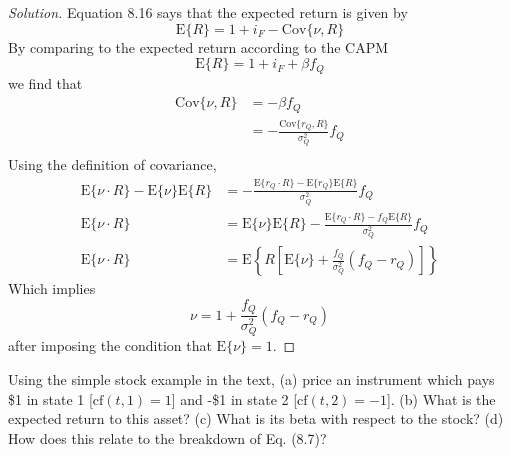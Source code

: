 \begin{proof}[Solution]
  Equation 8.16 says that the expected return is given by
  \begin{equation*}
   \mathrm{E}\{R\}=1+i_{F}-\mathrm{Cov}\{\nu,R\}
  \end{equation*}
  By comparing to the expected return according to the CAPM
  \begin{equation*}
   \mathrm{E}\{R\}=1+i_{F}+\beta f_{Q}
  \end{equation*}
  we find that
  \begin{align*}
   \mathrm{Cov}\{\nu,R\}&=-\beta f_{Q}\\
			&=-\frac{\mathrm{Cov}\{r_{Q},R\}}{\sigma_{Q}^{2}}f_{Q}\\
  \end{align*}
  Using the definition of covariance,
  \begin{align*}
    \mathrm{E}\{\nu\cdot R\}-\mathrm{E}\{\nu\}\mathrm{E}\{R\}&=-\frac{\mathrm{E}\{r_{Q}\cdot R\}-\mathrm{E}\{r_{Q}\}\mathrm{E}\{R\}}{\sigma_{Q}^{2}}f_{Q}\\	
    \mathrm{E}\{\nu\cdot R\}&=\mathrm{E}\{\nu\}\mathrm{E}\{R\}-\frac{\mathrm{E}\{r_{Q}\cdot R\}-f_{Q}\mathrm{E}\{R\}}{\sigma_{Q}^{2}}f_{Q}\\
    \mathrm{E}\{\nu\cdot R\}&=\mathrm{E}\left\{R\left[\mathrm{E}\{\nu\}+\frac{f_{Q}}{\sigma_{Q}^{2}}\left(f_{Q}-r_{Q}\right)\right]\right\}
  \end{align*}
  Which implies
  \begin{equation*}
   \nu = 1 + \frac{f_{Q}}{\sigma_{Q}^{2}}\left(f_{Q}-r_{Q}\right)
  \end{equation*}
  after imposing the condition that $\mathrm{E}\{\nu\}=1$.
  
  
\end{proof}

\begin{problem}{8.3}
 Using the simple stock example in the text, (a) price an instrument which pays \$1 in state 1 [$\mathrm{cf}(t,1)=1$] and -\$1 in state 2 [$\mathrm{cf}(t,2)=-1$]. (b) What is the expected return to this asset? (c) What is its beta with respect to the stock? (d) How does this relate to the breakdown of Eq. (8.7)?
\end{problem}


